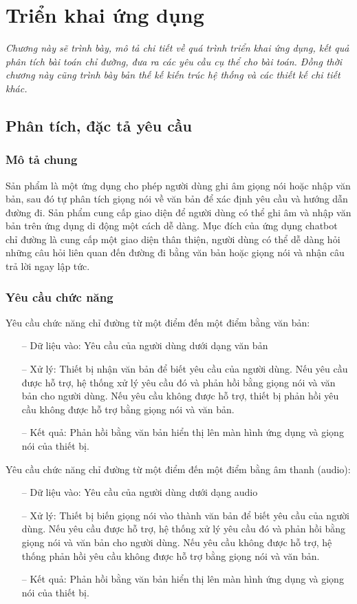 \chapter{Triển khai ứng dụng}
\label{Chapter4}

\emph{Chương này sẽ trình bày, mô tả chi tiết về quá trình triển khai ứng dụng, kết quả phân tích bài toán chỉ đường, đưa ra các yêu cầu cụ thể cho bài toán. Đồng thời chương này cũng trình bày bản thế kế kiến trúc hệ thống và các thiết kế chi tiết khác.}

\section{Phân tích, đặc tả yêu cầu}

\subsection{Mô tả chung}
Sản phẩm là một ứng dụng cho phép người dùng ghi âm giọng nói hoặc nhập văn bản, sau đó tự phân tích giọng nói về văn bản để xác định yêu cầu và hướng dẫn đường đi. Sản phẩm cung cấp giao diện để người dùng có thể ghi âm và nhập văn bản trên ứng dụng di động một cách dễ dàng.
Mục đích của ứng dụng chatbot chỉ đường là cung cấp một giao diện thân thiện, người dùng có thể dễ dàng hỏi những câu hỏi liên quan đến đường đi bằng văn bản hoặc giọng nói và nhận câu trả lời ngay lập tức.
\subsection{Yêu cầu chức năng}

Yêu cầu chức năng chỉ đường từ một điểm đến một điểm bằng văn bản:
\begin{itemize}
    \item[--] Dữ liệu vào: Yêu cầu của người dùng dưới dạng văn bản
    \item[--] Xử lý: Thiết bị nhận văn bản để biết yêu cầu của người dùng. Nếu yêu cầu được hỗ trợ, hệ thống xử lý yêu cầu đó và phản hồi bằng giọng nói và văn bản cho người dùng. Nếu yêu cầu không được hỗ trợ, thiết bị phản hồi yêu cầu không được hỗ trợ bằng giọng nói và văn bản.
    \item[--] Kết quả: Phản hồi bằng văn bản hiển thị lên màn hình ứng dụng và giọng nói của thiết bị.
\end{itemize}
Yêu cầu chức năng chỉ đường từ một điểm đến một điểm bằng âm thanh (audio):
\begin{itemize}
    \item[--] Dữ liệu vào: Yêu cầu của người dùng dưới dạng audio
    \item[--] Xử lý: Thiết bị biến giọng nói vào thành văn bản để biết yêu cầu của người dùng. Nếu yêu cầu được hỗ trợ, hệ thống xử lý yêu cầu đó và phản hồi bằng giọng nói và văn bản cho người dùng. Nếu yêu cầu không được hỗ trợ, hệ thống phản hồi yêu cầu không được hỗ trợ bằng giọng nói và văn bản.
    \item[--] Kết quả: Phản hồi bằng văn bản hiển thị lên màn hình ứng dụng và giọng nói của thiết bị.
\end{itemize}



